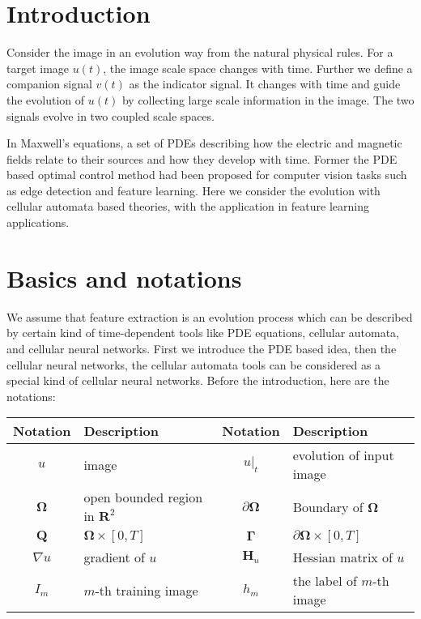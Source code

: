 \documentclass{amsart}
\theoremstyle{definition}
\theoremstyle{remark}
\numberwithin{equation}{section}
\begin{document}
\section{Introduction}
Consider the image in an evolution way from the natural physical rules.
For a target image $u(t)$,  the image scale space changes with time. 
Further we define a companion signal $v(t)$ as the indicator signal.
It changes with time and guide the evolution of $u(t)$ by collecting  large scale information in the image.
The two signals evolve in two coupled scale spaces.

In Maxwell's equations, a set of PDEs describing how the electric and magnetic fields relate to their sources and how they develop with time.
Former the PDE based optimal control method had been proposed for computer vision tasks such as edge detection and feature learning.
Here we consider the evolution with cellular automata based theories, with the application in feature learning applications.

\section{Basics and notations}
We assume that feature extraction is an evolution process which can be described by certain kind of time-dependent tools like PDE equations, cellular automata, and cellular neural networks.
First we introduce the PDE based idea, then the cellular neural networks, the cellular automata tools can be considered as a special kind of cellular neural networks.
Before the introduction, here are the notations:

\begin{center}
\begin{tabular}{clcl}
\hline
Notation    & Description & Notation & Description \\
\hline
${u}$  &  image  & ${u}|_{t}$  & evolution of input image \\
$\mathbf{\Omega}$  & open bounded region in $\mathbf{R}^2$ &$\partial{\mathbf{\Omega}}$  & Boundary of   $\mathbf{\Omega}$  \\
$\mathbf{Q}$       & $\mathbf{\Omega} \times [0, T]$     &  $\mathbf{\Gamma}$   & $\partial{\mathbf{\Omega}}\times [0, T]$   \\
$\nabla {u}$       & gradient of $u$     & $\mathbf{H}_{u}$     & Hessian matrix of $u$ \\
$I_m$ & $m$-th training image      & $h_m$     &   the label of $m$-th  image  \\
\hline
\end{tabular}
\end{center}
\end{document}
